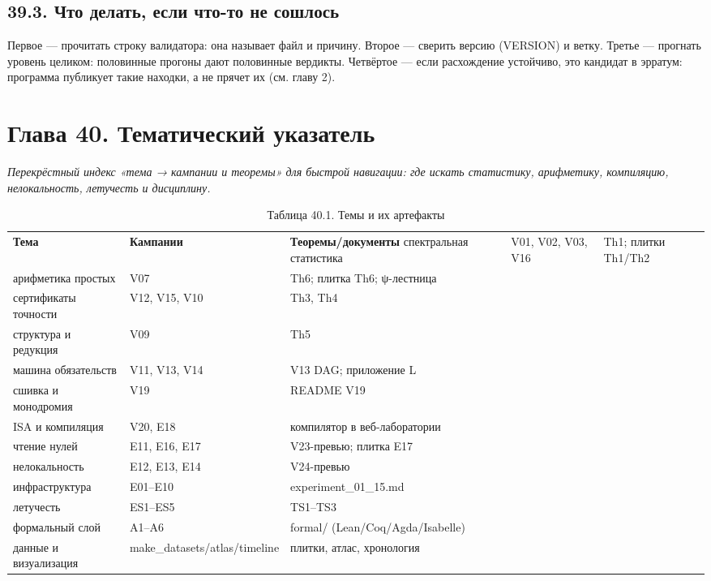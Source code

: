 \documentclass[11pt,a4paper]{article}
\begin{document}
\subsection{39.3. Что делать, если что-то не сошлось}

Первое — прочитать строку валидатора: она называет файл и причину. Второе — сверить версию (VERSION) и ветку. Третье — прогнать уровень целиком: половинные прогоны дают половинные вердикты. Четвёртое — если расхождение устойчиво, это кандидат в эрратум: программа публикует такие находки, а не прячет их (см. главу 2).

\section{Глава 40. Тематический указатель}

\noindent\textit{\color{copper}Перекрёстный индекс «тема → кампании и теоремы» для быстрой навигации: где искать статистику, арифметику, компиляцию, нелокальность, летучесть и дисциплину.}

\begin{table}[htbp]\centering\small
\caption{Таблица 40.1. Темы и их артефакты}
\begin{tabular}{p{} p{} p{}}
\toprule
\textbf{Тема} & \textbf{Кампании} & \textbf{Теоремы/документы}
\midrule
спектральная статистика & V01, V02, V03, V16 & Th1; плитки Th1/Th2 \\
арифметика простых & V07 & Th6; плитка Th6; ψ-лестница \\
сертификаты точности & V12, V15, V10 & Th3, Th4 \\
структура и редукция & V09 & Th5 \\
машина обязательств & V11, V13, V14 & V13 DAG; приложение L \\
сшивка и монодромия & V19 & README V19 \\
ISA и компиляция & V20, E18 & компилятор в веб-лаборатории \\
чтение нулей & E11, E16, E17 & V23-превью; плитка E17 \\
нелокальность & E12, E13, E14 & V24-превью \\
инфраструктура & E01–E10 & experiment\_01\_15.md \\
летучесть & ES1–ES5 & TS1–TS3 \\
формальный слой & A1–A6 & formal/ (Lean/Coq/Agda/Isabelle) \\
данные и визуализация & make\_datasets/atlas/timeline & плитки, атлас, хронология \\
\bottomrule
\end{tabular}
\end{table}
\end{document}
